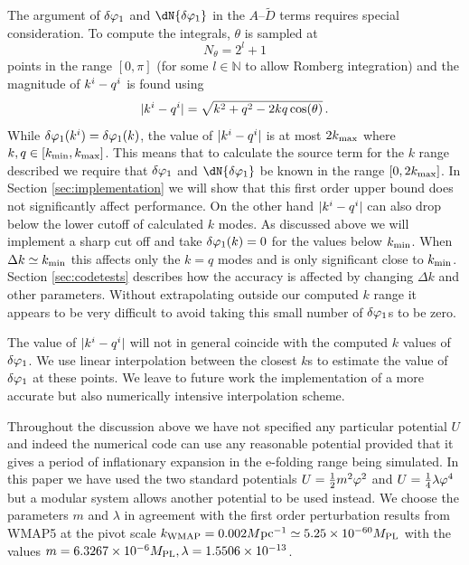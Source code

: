 The argument of $\delta\varphi_{1}$ and $\dN{\dvp1}$ in the $A$--$\tilde{D}$ terms requires
special consideration. 
To compute the integrals, $\theta$ is sampled at 
% 
\begin{equation}
\label{eq:nthetadefn}
N_\theta = 2^l + 1
\end{equation}
% 
points in the range
$[0,\pi]$ (for some $l\in \mathbb{N}$ to allow Romberg integration) and the magnitude of
$k^i-q^i$
is
found using
% 
\begin{equation}
 |k^i -q^i| = \sqrt{k^2 + q^2 - 2kq\cos(\theta)}\,.
\end{equation}
%
While $\delta\varphi_{1}(k^i)=\delta\varphi_{1}(k)$, the value of $|k^i-q^i|$ is at most
$2k_{\mathrm{max}}$ where $k,q \in [k_{\mathrm{min}},k_{\mathrm{max}}]$. This means that to calculate
the source term for the $k$ range described we require that $\delta\varphi_{1}$
and $\dN{\dvp1}$ be known in the range $[0, 2k_{\mathrm{max}}]$. In
Section \ref{sec:implementation} we will 
show that this first order upper bound does not significantly affect
performance. On the other hand $|k^i-q^i|$ can also drop below the
lower cutoff of calculated $k$ modes. As discussed above we will implement a sharp cut off and
take $\delta\varphi_{1}(k)=0$ for the values below
$k_{\mathrm{min}}$. When $\Delta k \simeq k_{\mathrm{min}}$ this affects only the $k=q$ modes and
is only significant close to $k_{\mathrm{min}}$. Section \ref{sec:codetests}
describes how the accuracy is affected by changing $\Delta k$ and
other parameters. Without extrapolating outside our computed $k$ range
it appears to be very difficult to avoid taking this small number of
$\delta\varphi_{1}$s to be zero.


The value of $|k^i-q^i|$ will not in general coincide with the computed $k$
values of $\delta\varphi_{1}$. We use linear interpolation between the closest $k$s to
estimate the value of $\delta\varphi_{1}$ at these points. We leave to future work the
implementation of a more
accurate but also numerically intensive interpolation scheme.


Throughout the discussion above we have not specified any particular
potential $U$ and indeed the numerical code can use any reasonable
potential provided that it gives a period of inflationary expansion in
the e-folding range being simulated. In this paper we have used the two
standard potentials $U=\frac{1}{2} m^2 \varphi^2$ and $U=\frac{1}{4}\lambda\varphi^4$
but a modular system allows another potential to be used instead. We
choose the parameters $m$ and $\lambda$ in agreement with the first
order perturbation results from WMAP5 at the pivot scale
$k_\mathrm{WMAP}=0.002M \mathrm{pc}^{-1} \simeq5.25\times10^{- 60} M_{\mathrm{PL}}$ with the values $m=6.3267\times10^{-6}
M_{\mathrm{PL}}, \lambda=1.5506\times10^{-13}$.


